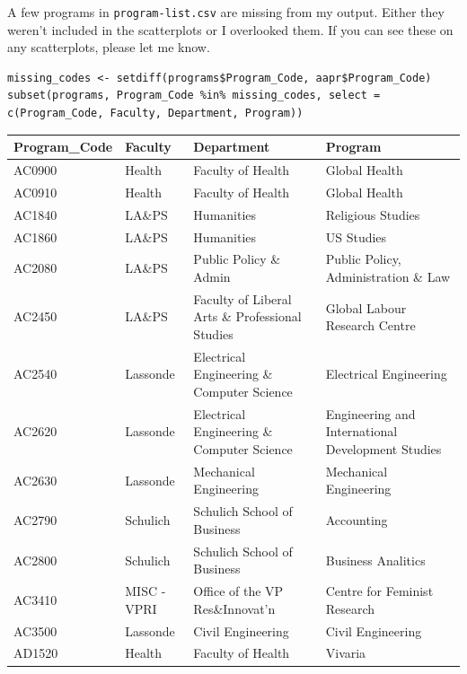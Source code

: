 \documentclass[article,10pt,microtype]{article}
\begin{document}
A few programs in \texttt{program-list.csv} are missing from my output.  Either they weren't included in the scatterplots or I overlooked them.  If you can see these on any scatterplots, please let me know.

\begin{verbatim}
missing_codes <- setdiff(programs$Program_Code, aapr$Program_Code)
subset(programs, Program_Code %in% missing_codes, select = c(Program_Code, Faculty, Department, Program))
\end{verbatim}

\begin{center}
\begin{tabular}{llll}
Program\_Code & Faculty & Department & Program\\
\hline
AC0900 & Health & Faculty of Health & Global Health\\
AC0910 & Health & Faculty of Health & Global Health\\
AC1840 & LA\&PS & Humanities & Religious Studies\\
AC1860 & LA\&PS & Humanities & US Studies\\
AC2080 & LA\&PS & Public Policy \& Admin & Public Policy, Administration \& Law\\
AC2450 & LA\&PS & Faculty of Liberal Arts \& Professional Studies & Global Labour Research Centre\\
AC2540 & Lassonde & Electrical Engineering \& Computer Science & Electrical Engineering\\
AC2620 & Lassonde & Electrical Engineering \& Computer Science & Engineering and International Development Studies\\
AC2630 & Lassonde & Mechanical Engineering & Mechanical Engineering\\
AC2790 & Schulich & Schulich School of Business & Accounting\\
AC2800 & Schulich & Schulich School of Business & Business Analitics\\
AC3410 & MISC - VPRI & Office of the VP Res\&Innovat'n & Centre for Feminist Research\\
AC3500 & Lassonde & Civil Engineering & Civil Engineering\\
AD1520 & Health & Faculty of Health & Vivaria\\
\end{tabular}
\end{center}
\end{document}
